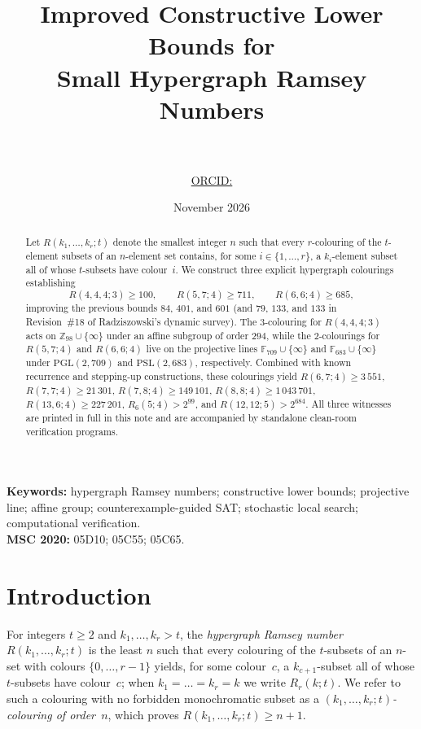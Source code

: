 \documentclass[11pt]{article}
\title{\bfseries Improved Constructive Lower Bounds for\\ Small Hypergraph Ramsey Numbers}
\author{\AuthorName\\[4pt]
\small \AuthorAffiliation\\[2pt]
\small\texttt{\AuthorEmail} \;\textperiodcentered\; \href{https://orcid.org/\AuthorORCID}{ORCID: \texttt{\AuthorORCID}}}
\date{November 2026}
\theoremstyle{remark}
\newcommand{\F}{\mathbb{F}}
\newcommand{\Z}{\mathbb{Z}}
\begin{document}
\maketitle

\begin{abstract}
Let $R(k_1,\dots,k_r;t)$ denote the smallest integer $n$ such that every
$r$-colouring of the $t$-element subsets of an $n$-element set contains, for
some $i\in\{1,\dots,r\}$, a $k_i$-element subset all of whose $t$-subsets have
colour~$i$. We construct three explicit hypergraph colourings establishing
\[
  R(4,4,4;3)\ge 100,\qquad R(5,7;4)\ge 711,\qquad R(6,6;4)\ge 685,
\]
improving the previous bounds $84$, $401$, and $601$ (and $79$, $133$, and
$133$ in Revision~\#18 of Radziszowski's dynamic survey). The $3$-colouring for
$R(4,4,4;3)$ acts on $\Z_{98}\cup\{\infty\}$ under an affine subgroup of order
$294$, while the $2$-colourings for $R(5,7;4)$ and $R(6,6;4)$ live on the
projective lines $\F_{709}\cup\{\infty\}$ and $\F_{683}\cup\{\infty\}$ under
$\mathrm{PGL}(2,709)$ and $\mathrm{PSL}(2,683)$, respectively. Combined with
known recurrence and stepping-up constructions, these colourings yield
$R(6,7;4)\ge 3\,551$, $R(7,7;4)\ge 21\,301$, $R(7,8;4)\ge 149\,101$,
$R(8,8;4)\ge 1\,043\,701$, $R(13,6;4)\ge 227\,201$, $R_6(5;4)>2^{99}$, and
$R(12,12;5)>2^{684}$. All three witnesses are printed in full in this note and
are accompanied by standalone clean-room verification programs.
\end{abstract}

\medskip
\noindent\textbf{Keywords:} hypergraph Ramsey numbers; constructive lower
bounds; projective line; affine group; counterexample-guided SAT; stochastic
local search; computational verification.\\
\textbf{MSC 2020:} 05D10; 05C55; 05C65.

\section{Introduction}

For integers $t\ge 2$ and $k_1,\dots,k_r>t$, the \emph{hypergraph Ramsey number}
$R(k_1,\dots,k_r;t)$ is the least $n$ such that every colouring of the
$t$-subsets of an $n$-set with colours $\{0,\dots,r-1\}$ yields, for some
colour~$c$, a $k_{c+1}$-subset all of whose $t$-subsets have colour~$c$; when
$k_1=\dots=k_r=k$ we write $R_r(k;t)$. We refer to such a colouring with no
forbidden monochromatic subset as a \emph{$(k_1,\dots,k_r;t)$-colouring of
order~$n$}, which proves $R(k_1,\dots,k_r;t)\ge n+1$.
\end{document}
